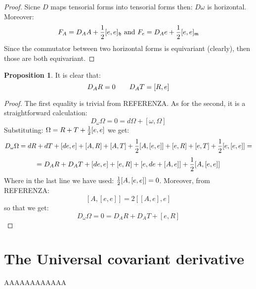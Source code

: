 \documentclass[12pt,a4paper]{report}
\theoremstyle{definition}
\theoremstyle{Theorem}
\newtheorem{Prop}[Def]{Proposition}
\theoremstyle{definition}
\theoremstyle{definition}
\begin{document}
	\begin{proof}
		Sicne $D$ maps tensorial forms into tensorial forms then: $D\omega$ is horizontal. Moreover:
		$$F_A=D_AA+{1\over 2}[e,e]_\mathfrak{h}\hbox{ and }F_e=D_Ae+{1\over 2}[e,e]_\mathfrak{m}$$
		Since the commutator between two horizontal forms is equivariant (clearly), then those are both equivariant.
	\end{proof}
	\begin{Prop}
		It is clear that:
		$$D_AR=0\hspace{20 pt}D_AT=[R,e]$$
	\end{Prop}
	\begin{proof}
		The first equality is trivial from REFERENZA. As for the second, it is a straightforward calculation:
		$$D_\omega \Omega=0=d\Omega+[\omega,\Omega]$$
		Substituting: $\Omega=R+T+{1\over 2}[e,e]$ we get:
		$$D_\omega \Omega=dR+dT+[de,e]+[A,R]+[A,T]+{1\over 2}[A,[e,e]]+[e,R]+[e,T]+{1\over 2}[e,[e,e]]=$$
		$$=D_AR+D_AT+[de,e]+[e,R]+[e,de+[A,e]]+{1\over 2}[A,[e,e]]$$
		Where in the last line we have used: ${1\over 2}[A,[e,e]]=0$. Moreover, from REFERENZA:
		$$[A,[e,e]]=2[[A,e],e]$$
		so that we get:
		$$D_\omega\Omega=0=D_AR+D_AT+[e,R]$$ 
	\end{proof}
	\section{The Universal covariant derivative}
	AAAAAAAAAAAA
\end{document}
